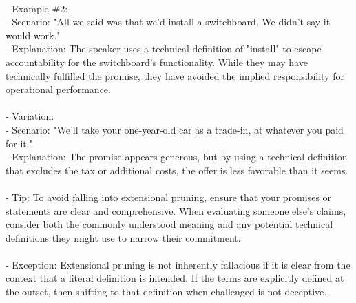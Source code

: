\documentclass[a4paper,12pt,single,pdftex]{scrbook}
\begin{document}
    
      
    \\

    
      - Example \#2:
    \\

    
        - Scenario: "All we said was that we’d install a switchboard. We didn’t say it would work."
    \\

    
        - Explanation: The speaker uses a technical definition of "install" to escape accountability for the switchboard’s functionality. While they may have technically fulfilled the promise, they have avoided the implied responsibility for operational performance.
    \\

    
      
    \\

    
      - Variation:
    \\

    
        - Scenario: "We’ll take your one-year-old car as a trade-in, at whatever you paid for it."
    \\

    
        - Explanation: The promise appears generous, but by using a technical definition that excludes the tax or additional costs, the offer is less favorable than it seems.
    \\

    
      
    \\

    
      - Tip: To avoid falling into extensional pruning, ensure that your promises or statements are clear and comprehensive. When evaluating someone else's claims, consider both the commonly understood meaning and any potential technical definitions they might use to narrow their commitment.
    \\

    
      
    \\

    
      - Exception: Extensional pruning is not inherently fallacious if it is clear from the context that a literal definition is intended. If the terms are explicitly defined at the outset, then shifting to that definition when challenged is not deceptive.
    \\

    
      
    \\
\end{document}
